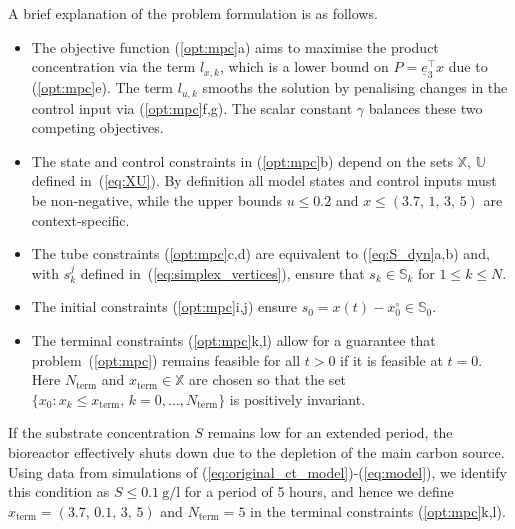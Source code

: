 \documentclass[final,5p,times,twocolumn,authoryear]{elsarticle}
\def\S{\mathbb{S}}
\def\X{\mathbb{X}}
\def\U{\mathbb{U}}
\begin{document}
A brief explanation of the problem formulation is as follows.
\begin{itemize}
\item
The objective function (\ref{opt:mpc}a) aims to maximise the product concentration via the term $l_{x,k}$, which is a lower bound on $P = \underline{e}_3^\top x$ due to (\ref{opt:mpc}e). The term $l_{u,k}$ smooths the solution by penalising changes in the control input via (\ref{opt:mpc}f,g). The scalar constant $\gamma$ balances these two competing objectives. 
\item
The state and control constraints in (\ref{opt:mpc}b) depend on the sets $\X$, $\U$ defined in~(\ref{eq:XU}). By definition all model states and control inputs must be non-negative, while the upper bounds $u \leq 0.2$ and $x \leq (3.7,\, 1,\, 3,\, 5)$ are context-specific.
\item
The tube constraints (\ref{opt:mpc}c,d) are equivalent to (\ref{eq:S_dyn}a,b) and, with $s^j_k$ defined in~(\ref{eq:simplex_vertices}), ensure that $s_k\in\S_k$ for  $1 \leq k \leq N$.
\item
The initial constraints (\ref{opt:mpc}i,j) ensure $s_0=x(t)-x_0^\circ\in\S_0$.
\item
The terminal constraints (\ref{opt:mpc}k,l) allow for a guarantee that problem~(\ref{opt:mpc}) remains feasible for all $t > 0$ if it is feasible at $t=0$. Here $N_{\mathrm{term}}$ and $x_{\mathrm{term}}\in\X$ are chosen so that the set $\{x_0 : x_k \leq x_{\mathrm{term}}, \, k = 0,\ldots,N_{\mathrm{term}}\}$ is positively invariant.
\end{itemize}


If the substrate concentration $S$ remains low for an extended period, the bioreactor effectively shuts down due to the depletion of the main carbon source.
%
Using data from simulations of (\ref{eq:original_ct_model})-(\ref{eq:model}), we identify this condition as $S \leq \SI{0.1}{\gram\per\litre}$ for a period of 5 hours, and hence we define $x_{\mathrm{term}} = (3.7, \, 0.1,\, 3,\, 5)$ and $N_{\mathrm{term}} = 5$ in the terminal constraints (\ref{opt:mpc}k,l).
\end{document}
